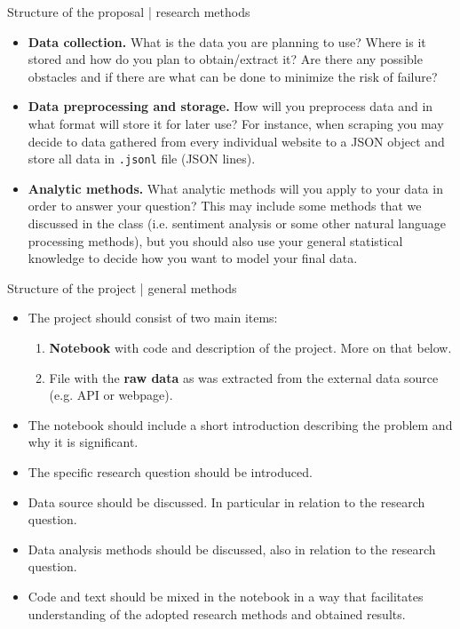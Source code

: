 \documentclass{beamer}
\begin{document}
\begin{frame}{Structure of the proposal | research methods}
    \begin{itemize}
     \item \textbf{Data collection.} What is the data you are planning to use?
     Where is it stored and how do you plan to obtain/extract it?  Are there any
     possible obstacles and if there are what can be done to minimize the risk
     of failure?
     \item \textbf{Data preprocessing and storage.} How will you preprocess data
     and in what format will store it for later use? For instance, when scraping
     you may decide to data gathered from every individual website to a JSON
     object and store all data in \texttt{.jsonl} file (JSON lines).
     \item \textbf{Analytic methods.} What analytic methods will you apply to
     your data in order to answer your question? This may include some methods
     that we discussed in the class (i.e. sentiment analysis or some other
     natural language processing methods), but you should also use your general
     statistical knowledge to decide how you want to model your final data.
    \end{itemize}
\end{frame}
    
\begin{frame}{Structure of the project | general methods}
    \begin{itemize}
     \item The project should consist of two main items:
     \begin{enumerate}
     \item \textbf{Notebook} with code and description of the project.
     More on that below.
     \item File with the \textbf{raw data} as was extracted from the external
     data source (e.g. API or webpage).
     \end{enumerate}
     \item The notebook should include a short introduction describing the
     problem and why it is significant.
     \item The specific research question should be introduced.
     \item Data source should be discussed. In particular in relation to the
     research question.
     \item Data analysis methods should be discussed, also in relation to the
     research question.
     \item Code and text should be mixed in the notebook in a way that
     facilitates understanding of the adopted research methods and obtained
     results.
    \end{itemize}
\end{frame}
    
\end{document}
